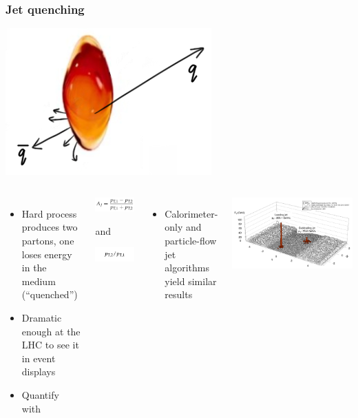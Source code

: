 \documentclass[compress]{beamer}
\begin{document}
\begin{frame}
\frametitle{Jet quenching}

\vspace{-0.95 cm}
\hspace{2.3 cm} \includegraphics[height=1.5 cm]{droplets1_small.png}

\vspace{-0.55 cm}
\begin{columns}
\begin{minipage}{2.2\linewidth}
\begin{itemize}
\item Hard process produces two partons, one loses energy in the medium (``quenched'')

\item Dramatic enough at the LHC to see it in event displays

\item Quantify with
\end{itemize}
\end{minipage}

\vspace{-0.3 cm}
\begin{center}
\includegraphics[height=0.7 cm]{dijets/aj_definition.png}

and

\includegraphics[height=0.7 cm]{dijets/ptratio.png}

\vspace{-0.3 cm}
\end{center}

\vspace{-0.5 cm}
\begin{itemize}
\item Calorimeter-only and particle-flow jet algorithms yield similar results
\end{itemize}

\vspace{0.5 cm}

\hfill \includegraphics[width=0.5\linewidth]{dijets/eventdisplay.png}


\end{columns}
\end{frame}
\end{document}
